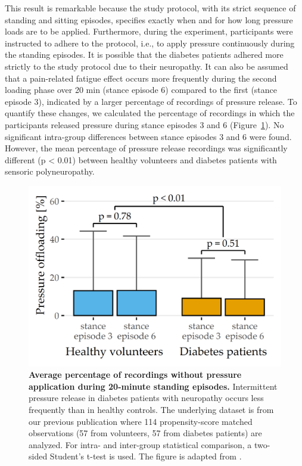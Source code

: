 \documentclass[
  oneside]{book}
\begin{document}
This result is remarkable because the study protocol, with its strict sequence of standing and sitting episodes, specifies exactly when and for how long pressure loads are to be applied.
Furthermore, during the experiment, participants were instructed to adhere to the protocol, i.e., to apply pressure continuously during the standing episodes.
It is possible that the diabetes patients adhered more strictly to the study protocol due to their neuropathy.
It can also be assumed that a pain-related fatigue effect occurs more frequently during the second loading phase over 20 min (stance episode 6) compared to the first (stance episode 3), indicated by a larger percentage of recordings of pressure release.
To quantify these changes, we calculated the percentage of recordings in which the participants released pressure during stance episodes 3 and 6 (Figure~\ref{fig:07-press-variance}).
No significant intra-group differences between stance episodes 3 and 6 were found.
However, the mean percentage of pressure release recordings was significantly different (p \textless{} 0.01) between healthy volunteers and diabetes patients with sensoric polyneuropathy.



\begin{figure}[htb]

{\centering \includegraphics[width=0.5\linewidth]{figures/07-press-variance} 

}

\caption{\textbf{Average percentage of recordings without pressure application during 20-minute standing episodes.} Intermittent pressure release in diabetes patients with neuropathy occurs less frequently than in healthy controls. The underlying dataset is from our previous publication \autocite{Niemann:EBioMedicine2020} where 114 propensity-score matched observations (57 from volunteers, 57 from diabetes patients) are analyzed. For intra- and inter-group statistical comparison, a two-sided Student's t-test is used. The figure is adapted from \autocite{Niemann:EBioMedicine2020}.}\label{fig:07-press-variance}
\end{figure}
\end{document}
